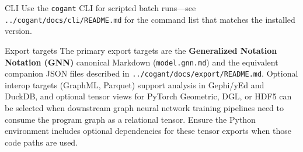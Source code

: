 \documentclass[
  ignorenonframetext,
]{beamer}
\begin{document}
\begin{frame}[fragile]{CLI}
\protect{}\label{cli}
Use the \texttt{cogant} CLI for scripted batch runs---see
\texttt{../cogant/docs/cli/README.md} for the command list that matches
the installed version.
\end{frame}

\begin{frame}[fragile]{Export targets}
\protect{}\label{export-targets}
The primary export targets are the \textbf{Generalized Notation Notation
(GNN)} canonical Markdown (\texttt{model.gnn.md}) and the equivalent
companion JSON files described in
\texttt{../cogant/docs/export/README.md}. Optional interop targets
(GraphML, Parquet) support analysis in Gephi/yEd and DuckDB, and
optional tensor views for PyTorch Geometric, DGL, or HDF5 can be
selected when downstream graph neural network training pipelines need to
consume the program graph as a relational tensor. Ensure the Python
environment includes optional dependencies for these tensor exports when
those code paths are used.
\end{frame}
\end{document}
